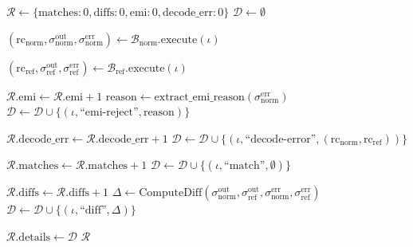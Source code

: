 \begin{algorithm}[H]
\begin{algorithmic}[1]
    \STATE $\mathcal{R} \leftarrow \{\text{matches}: 0, \text{diffs}: 0, \text{emi}: 0, \text{decode\_err}: 0\}$
    \STATE $\mathcal{D} \leftarrow \emptyset$ 

        \STATE {}
        \STATE $(\text{rc}_{\text{norm}}, \sigma_{\text{norm}}^{\text{out}}, \sigma_{\text{norm}}^{\text{err}}) \leftarrow \mathcal{B}_{\text{norm}}.\text{execute}(\iota)$

        \STATE {}
        \STATE $(\text{rc}_{\text{ref}}, \sigma_{\text{ref}}^{\text{out}}, \sigma_{\text{ref}}^{\text{err}}) \leftarrow \mathcal{B}_{\text{ref}}.\text{execute}(\iota)$

        \STATE {}
         
            \STATE $\mathcal{R}.\text{emi} \leftarrow \mathcal{R}.\text{emi} + 1$
            \STATE $\text{reason} \leftarrow \text{extract\_emi\_reason}(\sigma_{\text{norm}}^{\text{err}})$
            \STATE $\mathcal{D} \leftarrow \mathcal{D} \cup \{(\iota, \text{``emi-reject''}, \text{reason})\}$

            \STATE $\mathcal{R}.\text{decode\_err} \leftarrow \mathcal{R}.\text{decode\_err} + 1$
            \STATE $\mathcal{D} \leftarrow \mathcal{D} \cup \{(\iota, \text{``decode-error''}, (\text{rc}_{\text{norm}}, \text{rc}_{\text{ref}}))\}$

            \STATE $\mathcal{R}.\text{matches} \leftarrow \mathcal{R}.\text{matches} + 1$
            \STATE $\mathcal{D} \leftarrow \mathcal{D} \cup \{(\iota, \text{``match''}, \emptyset)\}$

        \ELSE
            \STATE $\mathcal{R}.\text{diffs} \leftarrow \mathcal{R}.\text{diffs} + 1$
            \STATE $\Delta \leftarrow \text{ComputeDiff}(\sigma_{\text{norm}}^{\text{out}}, \sigma_{\text{ref}}^{\text{out}}, \sigma_{\text{norm}}^{\text{err}}, \sigma_{\text{ref}}^{\text{err}})$
            \STATE $\mathcal{D} \leftarrow \mathcal{D} \cup \{(\iota, \text{``diff''}, \Delta)\}$
        \ENDIF
    \ENDFOR

    \STATE $\mathcal{R}.\text{details} \leftarrow \mathcal{D}$
    \RETURN $\mathcal{R}$
\ENDPROCEDURE

\end{algorithmic}
\end{algorithm}

